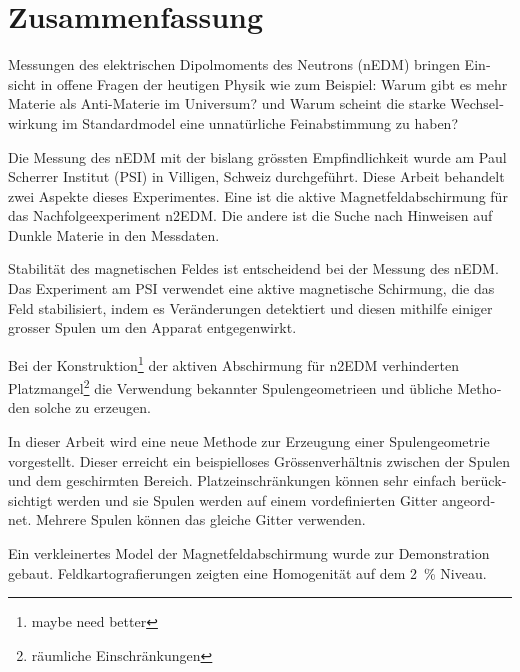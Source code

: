 

\begingroup
\let\clearpage\relax
\let\cleardoublepage\relax
\let\cleardoublepage\relax

\chapter*{Zusammenfassung} %

\newcommand{\jkfootnote}[1]{\footnote{#1}}

\begin{otherlanguage}{german}

Messungen des elektrischen Dipolmoments des Neutrons (nEDM) bringen Einsicht in offene Fragen der heutigen Physik wie zum Beispiel: \glqq{}Warum gibt es mehr Materie als Anti-Materie im Universum?\grqq{} und \glqq{}Warum scheint die starke Wechselwirkung im Standardmodel eine unnatürliche Feinabstimmung zu haben?\grqq

Die Messung des nEDM mit der bislang grössten Empfindlichkeit wurde am Paul Scherrer Institut (PSI) in Villigen, Schweiz durchgeführt.
Diese Arbeit behandelt zwei Aspekte dieses Experimentes. Eine ist die aktive Magnetfeldabschirmung  für das Nachfolgeexperiment n2EDM\@.
Die andere ist die Suche nach Hinweisen auf Dunkle Materie in den Messdaten.

Stabilität des magnetischen Feldes ist entscheidend bei der Messung des nEDM\@.
Das Experiment am PSI verwendet eine aktive magnetische Schirmung, die das Feld stabilisiert, indem es Veränderungen detektiert und diesen mithilfe einiger grosser Spulen um den Apparat entgegenwirkt.

Bei der Konstruktion\jkfootnote{maybe need better} der aktiven Abschirmung für n2EDM verhinderten Platzmangel\jkfootnote{räumliche Einschränkungen} die Verwendung bekannter Spulengeometrieen und übliche Methoden solche zu erzeugen.

In dieser Arbeit wird eine neue Methode zur Erzeugung einer Spulengeometrie vorgestellt. Dieser erreicht ein beispielloses Grössenverhältnis zwischen der Spulen und dem geschirmten Bereich.
Platzeinschränkungen können sehr einfach berücksichtigt werden und sie Spulen werden auf einem vordefinierten Gitter angeordnet. Mehrere Spulen können das gleiche Gitter verwenden.

Ein verkleinertes Model der Magnetfeldabschirmung wurde zur Demonstration gebaut. Feldkartografierungen zeigten eine Homogenität auf dem \SI{2}{\percent} Niveau.


\end{otherlanguage}
